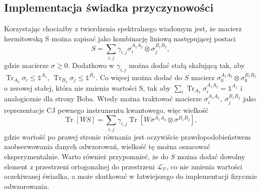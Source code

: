 \documentclass[10pt]{article} %
\DeclareMathOperator{\Trs}{Tr}
\newcommand{\I}{\mathbb{1}}
\begin{document}
\subsection{Implementacja świadka przyczynowości}
Korzystając chociażby z twierdzenia spektralnego wiadomym jest, że macierz hermitowską S można zapisać jako kombinację liniową następującej postaci
\begin{equation}
S = \sum_{i,j} \gamma_{i,j} \sigma^{A_1A_2}_i \otimes \sigma^{B_1B_2}_j,
\end{equation} gdzie macierze $\sigma \geq 0$. Dodatkowo w $\gamma_{i,j}$ można dodać stałą skalującą tak, aby $\Trs_{A_2} \sigma_i \leq \I^{A_1}$, $\Trs_{B_2} \sigma_j \leq \I^{B_1}$.
Co więcej można dodać do $S$ macierz $\sigma_0^{A_1A_2} \otimes \sigma_0^{B_1B_2}$ o zerowej stałej, która nie zmienia wartości S, tak aby $\sum_i \Trs_{A_2} \sigma^{A_1A_2}_i = \I^{A_1}$ i analogicznie dla strony Boba. Wtedy można traktować macierze $\sigma^{A_1A_2}_i,~ \sigma^{B_1B_2}_j$ jako reprezentacje CJ pewnego instrumentu kwantowego, więc wielkość
\begin{equation}
\Trs \left[ W S \right] = \sum_{i,j} \gamma_{i,j} \Trs\left[ W \sigma^{A_1A_2} \otimes \sigma^{B_1B_2} \right],
\end{equation} gdzie wartość po prawej stronie równania jest oczywiście prawdopodobieństwem zaobserwowania danych odwzorowań, wielkość tę można oszacować eksperymentalnie.
Warto również przypomnieć, że do $S$ można dodać dowolny element z przestrzeni ortogonalnej do przestrzeni $\mathcal{L_V}$, co nie zmienia wartości oczekiwanej świadka, a może skutkować w łatwiejszego do implementacji fizycznie odwzorowania. 
\end{document}
